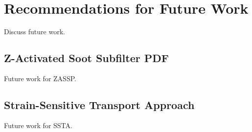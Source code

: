 \section{Recommendations for Future Work}
\label{sec:conclusion:future}

Discuss future work.


\subsection{Z-Activated Soot Subfilter PDF}
\label{sec:conclusion:future:zassp}

Future work for ZASSP.


\subsection{Strain-Sensitive Transport Approach}
\label{sec:conclusion:future:ssta}

Future work for SSTA.

